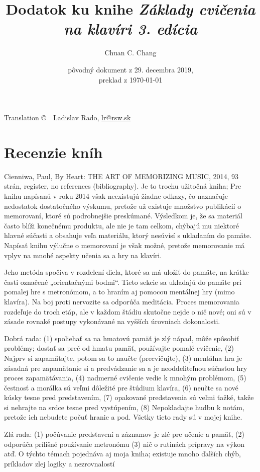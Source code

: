 \documentclass[11pt,a4paper%
]{article}
\title{Dodatok ku knihe \emph{Základy cvičenia na klavíri 3. edícia}}
\author{Chuan C. Chang}
\date{pôvodný dokument z 29. decembra 2019,\\preklad z \today}
\begin{document}
\maketitle
\begin{center}Translation \copyright\ \the\year\ Ladislav Rado, \href{mailto:lr@rsw.sk}{lr@rsw.sk}
\end{center}

\tableofcontents

\section{Recenzie kníh}
Cienniwa, Paul, By Heart: THE ART OF MEMORIZING MUSIC, 2014, 93 strán, register, no references (bibliography).
Je to trochu užitočná kniha; Pre knihu napísanú v roku 2014 však neexistujú žiadne odkazy, čo naznačuje nedostatok dostatočného výskumu, pretože už existuje množstvo publikácií o memorovaní, ktoré sú podrobnejšie preskúmané. Výsledkom je, že sa materiál často blíži konečnému produktu, ale nie je tam celkom, chýbajú mu niektoré hlavné súčasti a obsahuje veľa materiálu, ktorý nesúvisí s ukladaním do pamäte. Napísať knihu výlučne o memorovaní je však možné, pretože memorovanie má vplyv na mnohé aspekty učenia sa a hry na klavíri.

Jeho metóda spočíva v rozdelení diela, ktoré sa má uložiť do pamäte, na krátke časti označené „orientačnými bodmi“. Tieto sekcie sa ukladajú do pamäte pri pomalej hre s metronómom, a to hraním aj pomocou mentálnej hry (mimo klavíra). Na boj proti nervozite sa odporúča meditácia. Proces memorovania rozdeľuje do troch etáp, ale v každom štádiu skutočne nejde o nič nové; oni sú
v zásade rovnaké postupy vykonávané na vyšších úrovniach dokonalosti.

Dobrá rada:
(1) spoliehať sa na hmatovú pamäť je zlý nápad, môže spôsobiť problémy; dostať sa preč od hmatu
pamäť, používajte pomalé cvičenie,
(2) Najprv si zapamätajte, potom sa to naučte (precvičujte),
(3) mentálna hra je zásadná pre zapamätanie si a predvádzanie sa a je neoddeliteľnou súčasťou hry
proces zapamätávania,
(4) nadmerné cvičenie vedie k mnohým problémom,
(5) čestnosť a morálka sú veľmi dôležité pre štúdium klavíra,
(6) neučte sa nové kúsky tesne pred predstavením,
(7) opakované predstavenia sú veľmi ťažké, takže si nehrajte na srdce tesne pred vystúpením,
(8) Nepokladajte hudbu k notám, pretože ich nebudete počuť
hranie a pod.
Všetky tieto rady sú v mojej knihe.

Zlá rada:
(1) počúvanie predstavení a záznamov je zlé pre učenie a pamäť,
(2) odporúča prílišné používanie metronómu
(3) nič o rutinách prípravy na výkon atď.
O týchto témach pojednáva aj moja kniha; existuje mnoho ďalších chýb, príkladov zlej logiky a nezrovnalostí
\end{document}
